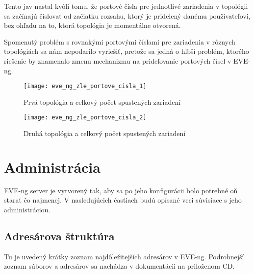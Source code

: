 Tento jav nastal kvôli tomu, že portové čísla pre jednotlivé zariadenia v topológii sa začínajú číslovať od začiatku rozsahu, ktorý je pridelený danému používateľovi, bez ohľadu na to, ktorá topológia je momentálne otvorená.

Spomenutý problém s rovnakými portovými číslami pre zariadenia v rôznych topológiách sa nám nepodarilo vyriešiť, pretože sa jedná o hlbší problém, ktorého riešenie by znamenalo zmenu mechanizmu na prideľovanie portových čísel v EVE-ng.

\begin{figure}
    \centering
    \texttt{[image: eve\_ng\_zle\_portove\_cisla\_1]}
    \caption{Prvá topológia a celkový počet spustených zariadení}
    \label{obr:eve_ng_zle_portove_cisla_1}
\end{figure}

\begin{figure}
    \centering
    \texttt{[image: eve\_ng\_zle\_portove\_cisla\_2]}
    \caption{Druhá topológia a celkový počet spustených zariadení}
    \label{obr:eve_ng_zle_portove_cisla_2}
\end{figure}




\section{Administrácia}

EVE-ng server je vytvorený tak, aby sa po jeho konfigurácii bolo potrebné oň starať čo najmenej. V nasledujúcich častiach budú opísané veci súvisiace s jeho administráciou.




\subsection{Adresárova štruktúra}
\label{chap:adresarova_struktura}

Tu je uvedený krátky zoznam najdôležitejších adresárov v EVE-ng. Podrobnejší zoznam súborov a adresárov sa nachádza v dokumentácii na priloženom CD.

